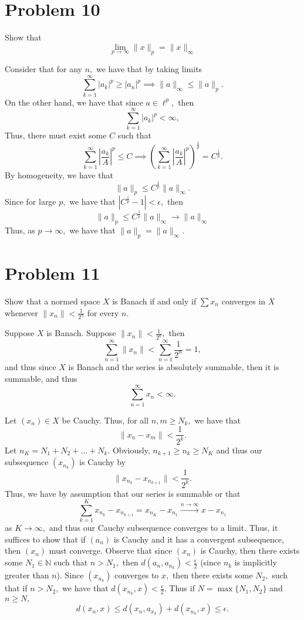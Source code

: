 \documentclass[11pt]{article}
\newcommand{\bbN}{\mathbb{N}}
\begin{document}
\begin{problem}
\section*{Problem 10}
\begin{problem}
    Show that 
    \[\lim_{p\to \infty}\|x\|_p = \|x\|_\infty\]
\end{problem}
\begin{solution}
    Consider that for any $n,$ we have that by taking limits
    \[\sum_{k=1}^\infty |a_k|^p \geq |a_n|^p \implies \|a\|_\infty \leq \|a\|_p.\] On the other hand, we have that since $a\in \ell^p,$ then
    \[\sum_{k=1}^\infty |a_k|^p < \infty,\] Thus, there must exist some $C$ such that \[\sum_{k=1}^\infty |\frac{a_k}{A}|^p  \leq C \implies \left(\sum_{k=1}^\infty |\frac{a_k}{A}|^p\right)^\frac{1}{p}  = C^{\frac{1}{p}}.\] By homogeneity, we have that 
    \[\|a\|_p \leq C^\frac{1}{p}\|a\|_\infty.\] Since for large $p,$ we have that $|C^\frac{1}{p} - 1|< \epsilon,$ then 
    \[\|a\|_p \leq C^\frac{1}{p}\|a\|_\infty \to \|a\|_\infty\] Thus, as $p\to \infty,$ we have that $\|a\|_p = \|a\|_\infty.$
\end{solution}

\newpage

\section*{Problem 11}
\begin{problem}
    Show that a normed space $X$ is Banach if and only if $\sum x_n$ converges in $X$ whenever $\|x_n\|< \frac{1}{2^n}$ for every $n.$
\end{problem}
\begin{solution}
    Suppose $X$ is Banach. Suppose $\|x_n\|< \frac{1}{2^n},$ then 
    \[\sum_{n=1}^\infty \|x_n\| < \sum_{n=1}^\infty \frac{1}{2^n} = 1,\] and thus since $X$ is Banach and the series is absolutely summable, then it is summable, and thus 
    \[\sum_{n=1}^\infty x_n < \infty.\]

    Let $(x_n) \in X$ be Cauchy. Thus, for all $n, m\geq N_k,$ we have that  
    \[\|x_n - x_m\| < \frac{1}{2^k}.\] Let $n_K = N_1 + N_2 + \dots + N_k.$ Obviously, $n_{k+1} \geq n_k \geq N_K$ and thus our subsequence $(x_{n_k})$ is Cauchy by
    \[\|x_{n_k} - x_{n_{k+1}}\|< \frac{1}{2^k}.\] Thus, we have by assumption that our series is summable or that
    \[\sum_{k=1}^K x_{n_k} - x_{n_{k+1}} = x_{n_K} - x_{n_1} \xrightarrow{n\to \infty} x - x_{n_1} \] as $K \to \infty,$ and thus our Cauchy subsequence converges to a limit. Thus, it suffices to show that if $(a_n)$ is Cauchy and it has a convergent subsequence, then $(x_n)$ must converge. Observe that since $(x_n)$ is Cauchy, then there exists some $N_1\in \bbN$ such that $n>N_1,$ then $d(a_n,a_{n_k})<\frac{\epsilon}{2}$ (since $n_k$ is implicitly greater than $n$). Since $(x_{n_k})$ converges to $x,$ then there exists some $N_2,$ such that if $n>N_2,$ we have that $d(x_{n_k},x)<\frac{\epsilon}{2}.$ Thus if $N = \max\{N_1, N_2\}$ and $n\geq N,$
    \[d(x_n, x)\leq d(x_n, a_{x_k}) + d(x_{n_k}, x)\leq \epsilon.\]
\end{solution}


\end{problem}
\end{document}
